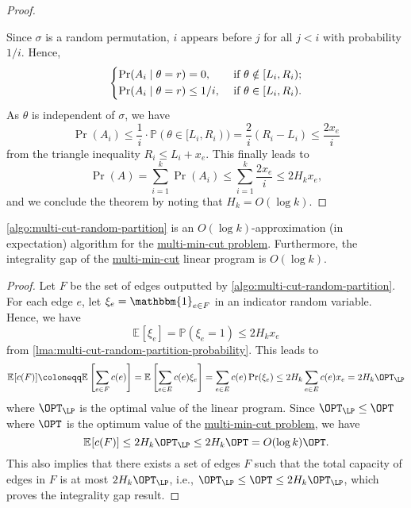 \begin{proof}
	\begin{center}
	\end{center}

	Since \(\sigma \) is a random permutation, \(i\) appears before \(j\) for all \(j < i\) with probability \(1 / i\). Hence,
	\[
		\begin{dcases}
			\Pr(A_i \mid \theta = r) = 0,        & \text{ if } \theta \notin [L_i, R_i) ; \\
			\Pr(A_i \mid \theta = r) \leq 1 / i, & \text{ if } \theta \in [L_i, R_i).
		\end{dcases}
	\]
	As \(\theta \) is independent of \(\sigma \), we have
	\[
		\Pr(A_i)
		\leq \frac{1}{i} \cdot \mathbb{P} (\theta \in [L_i, R_i))
		= \frac{2}{i} (R_i - L_i)
		\leq \frac{2x_e}{i}
	\]
	from the triangle inequality \(R_i \leq L_i + x_e\). This finally leads to
	\[
		\Pr(A)
		= \sum_{i=1}^{k} \Pr(A_i) \leq \sum_{i=1}^{k} \frac{2x_e}{i}
		\leq 2 H_k x_e,
	\]
	and we conclude the theorem by noting that \(H_k = O(\log k)\).
\end{proof}

\begin{theorem}\label{thm:multi-min-cut-integrality-gap}
	\autoref{algo:multi-cut-random-partition} is an \(O(\log k)\)-approximation (in expectation) algorithm for the \hyperref[prb:multi-min-cut]{multi-min-cut problem}. Furthermore, the integrality gap of the \hyperref[prb:multi-min-cut]{multi-min-cut} linear program is \(O(\log k)\).
\end{theorem}
\begin{proof}
	Let \(F\) be the set of edges outputted by \autoref{algo:multi-cut-random-partition}. For each edge \(e\), let \(\xi _e = \mathbbm{1}_{e \in F}\) in an indicator random variable. Hence, we have
	\[
		\mathbb{E}_{}[\xi _e]
		= \mathbb{P} (\xi _e = 1)
		\leq 2 H_k x_e
	\]
	from \autoref{lma:multi-cut-random-partition-probability}. This leads to
	\[
		\mathbb{E}_{}[c(F)]
		\coloneqq \mathbb{E}_{}\left[ \sum_{e \in F} c(e) \right]
		= \mathbb{E}_{}\left[\sum_{e \in E} c(e) \xi _e\right]
		= \sum_{e \in E} c(e) \Pr(\xi _e)
		\leq 2 H_k \sum_{e \in E} c(e) x_e
		= 2 H_k \OPT_{\LP}
	\]
	where \(\OPT_{\LP}\) is the optimal value of the linear program. Since \(\OPT_{\LP} \leq \OPT\) where \(\OPT\) is the optimum value of the \hyperref[prb:multi-min-cut]{multi-min-cut problem}, we have
	\[
		\mathbb{E}_{}[c(F)]
		\leq 2 H_k \OPT_{\LP}
		\leq 2 H_k \OPT
		= O(\log k) \OPT.
	\]
	This also implies that there exists a set of edges \(F\) such that the total capacity of edges in \(F\) is at most \(2 H_k \OPT_{\LP} \), i.e., \(\OPT_{\LP} \leq \OPT \leq 2 H_k \OPT_{\LP}\), which proves the integrality gap result.
\end{proof}

